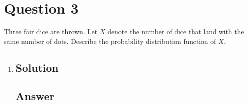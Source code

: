 \documentclass[12pt]{article}
\begin{document}
	
	\section*{Question 3}
	
	\noindent Three fair dice are thrown. Let $X$ denote the number of dice that land with the same number of dots. Describe the probability distribution function of $X$.
	
	\bigskip
	
	\begin{enumerate}[label={},leftmargin=0in]\item
		\subsection*{Solution}
		
		\subsection*{Answer}
		
			\[\boxed{}\]
	\end{enumerate}
	
\end{document}
